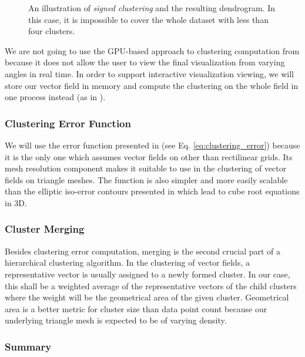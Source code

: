 \begin{figure}[h]
\centering
\def\svgwidth{\textwidth}

\caption[Forest Dendrogram]{An illustration of {\it signed clustering} and the resulting dendrogram. In this case, it is impossible to cover the whole dataset with less than four clusters.}
\label{fig:illustration-forest_dendrogram}
\end{figure}

We are not going to use the GPU-based approach to clustering computation from \citet{Peng12} because it does not allow the user to view the final visualization from varying angles in real time. In order to support interactive visualization viewing, we will store our vector field in memory and compute the clustering on the whole field in one process instead (as in \citet{Telea99}).

\subsubsection{Clustering Error Function}

We will use the error function presented in \citet{Peng12} (see Eq. \ref{eq:clustering_error}) because it is the only one which assumes vector fields on other than rectilinear grids. Its mesh resolution component makes it suitable to use in the clustering of vector fields on triangle meshes. The function is also simpler and more easily scalable than the elliptic iso-error contours presented in \citet{Telea99} which lead to cube root equations in 3D.

\subsubsection{Cluster Merging}

Besides clustering error computation, merging is the second crucial part of a hierarchical clustering algorithm. In the clustering of vector fields, a representative vector is usually assigned to a newly formed cluster. In our case, this shall be a weighted average of the representative vectors of the child clusters where the weight will be the geometrical area of the given cluster. Geometrical area is a better metric for cluster size than data point count because our underlying triangle mesh is expected to be of varying density.

\subsubsection{Summary}

